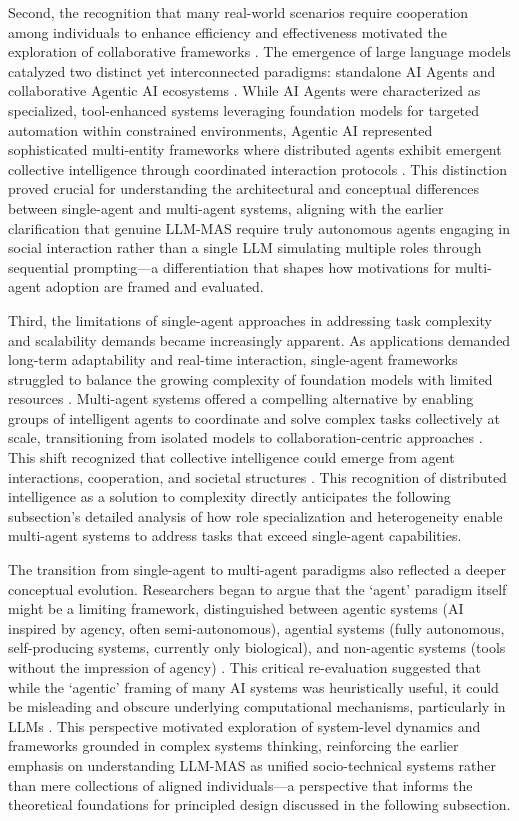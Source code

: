 \documentclass[11pt]{article}
\begin{document}
Second, the recognition that many real-world scenarios require cooperation among individuals to enhance efficiency and effectiveness motivated the exploration of collaborative frameworks \cite{ref16}. The emergence of large language models catalyzed two distinct yet interconnected paradigms: standalone AI Agents and collaborative Agentic AI ecosystems \cite{ref17}. While AI Agents were characterized as specialized, tool-enhanced systems leveraging foundation models for targeted automation within constrained environments, Agentic AI represented sophisticated multi-entity frameworks where distributed agents exhibit emergent collective intelligence through coordinated interaction protocols \cite{ref17}. This distinction proved crucial for understanding the architectural and conceptual differences between single-agent and multi-agent systems, aligning with the earlier clarification that genuine LLM-MAS require truly autonomous agents engaging in social interaction rather than a single LLM simulating multiple roles through sequential prompting---a differentiation that shapes how motivations for multi-agent adoption are framed and evaluated.

Third, the limitations of single-agent approaches in addressing task complexity and scalability demands became increasingly apparent. As applications demanded long-term adaptability and real-time interaction, single-agent frameworks struggled to balance the growing complexity of foundation models with limited resources \cite{ref18}. Multi-agent systems offered a compelling alternative by enabling groups of intelligent agents to coordinate and solve complex tasks collectively at scale, transitioning from isolated models to collaboration-centric approaches \cite{ref1}. This shift recognized that collective intelligence could emerge from agent interactions, cooperation, and societal structures \cite{ref11}. This recognition of distributed intelligence as a solution to complexity directly anticipates the following subsection's detailed analysis of how role specialization and heterogeneity enable multi-agent systems to address tasks that exceed single-agent capabilities.

The transition from single-agent to multi-agent paradigms also reflected a deeper conceptual evolution. Researchers began to argue that the `agent' paradigm itself might be a limiting framework, distinguished between agentic systems (AI inspired by agency, often semi-autonomous), agential systems (fully autonomous, self-producing systems, currently only biological), and non-agentic systems (tools without the impression of agency) \cite{ref19}. This critical re-evaluation suggested that while the `agentic' framing of many AI systems was heuristically useful, it could be misleading and obscure underlying computational mechanisms, particularly in LLMs \cite{ref19}. This perspective motivated exploration of system-level dynamics and frameworks grounded in complex systems thinking, reinforcing the earlier emphasis on understanding LLM-MAS as unified socio-technical systems rather than mere collections of aligned individuals---a perspective that informs the theoretical foundations for principled design discussed in the following subsection.
\end{document}
